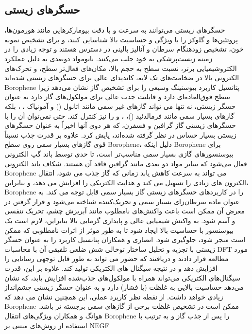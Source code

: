 \subsection{حسگرهای زیستی}
حسگرهای زیستی می‌توانند به سرعت و با دقت بیومارکرهایی مانند هورمون‌ها، پروتئین‌ها و گلوکز را با ویژگی و حساسیت بالا شناسایی کنند، \cite{taoEmergingTwodimensionalMonoelemental2019} و برای تشخیص نمونه خون، تشخیص زودهنگام سرطان و آنالیز بالینی در دسترس هستند و توجه زیادی را در زمینه زیست‌پزشکی به خود جلب می‌کنند. نانومواد دوبعدی به دلیل عملکرد الکتروشیمیایی برتر، نسبت سطح به حجم بالا،\cite{huangAdsorptionGasMolecules2018} مکان‌های فعال‌تر سطح، \cite{ranjanBoropheneNewSensation2020, li2DBoronSheets2020} و تحرک‌های الکترونی بالا در ضخامت‌های تک لایه، کاندیدای عالی برای حسگرهای زیستی شده‌اند \cite{liRatiometricImmunoassaysBuilt2019, ranjanBoropheneNewSensation2020} \gls{Borophene} پتانسیل کاربرد بیوسنینگ وسیعی را برای تشخیص گاز نشان می‌دهد زیرا سطح فوق‌العاده‌ای دارد و قابلیت جذب عالی برای مولکول‌های گاز دارد \cite{li2DBoronSheets2020} به عنوان حسگر زیستی، نه تنها می تواند گازهای غیر سمی مانند اتانول () \cite{xieTwoDimensionalBoropheneProperties2020} و آمونیاک ، \cite{huangAdsorptionGasMolecules2018}، بلکه گازهای بسیار سمی مانند فرمالدئید ()، ، و  \cite{huangAdsorptionGasMolecules2018} را نیز کنترل کند. حتی نمی‌توان آن را با حسگرهای زیستی گاز گرافین و فسفرن، که هر دوی آنها اخیراً به عنوان حسگرهای زیستی بسیار حساس در نظر گرفته شده‌اند، پایش کرد. علاوه بر قدرت جذب نسبتاً قوی گازهای بسیار سمی روی سطح \gls{Borophene}، دلیل اینکه \gls{Borophene} برای بیوسنسورهای گازی بسیار سمی مناسب‌تر است، تا حدی توسط باند گپ الکترونی فعال می‌شود که سایر مواد دو بعدی مانند گرافین فاقد آن هستند. شکاف باند الکترونی \gls{Borophene} می تواند به سرعت کاهش یابد زمانی که گاز جذب می شود، انتقال الکترون های زیادی را تسهیل می کند و هدایت الکتریکی را افزایش می دهد، و بنابراین، \gls{Borophene} را در کاربردهای حسگرهای زیستی گاز بسیار سمی قابل توجه می کند. \cite{shuklaRealization2DBorophene2017}  به عنوان ماده سرطان‌زای بسیار سمی و تحریک‌کننده شناخته می‌شود و قرار گرفتن در معرض آن ممکن است باعث واکنش‌های نامطلوب مانند آبریزش چشم، تحریک تنفسی و آسم شود. به واکنش شیمیایی عالی و پایداری گرمایی بالا \cite{cockcroftOCCUPATIONALASTHMACAUSED1982} بنابراین، لازم است یک بیوسنسور  با حساسیت بالا ایجاد شود تا به طور موثر از اثرات نامطلوبی که  ممکن است منجر شود، جلوگیری شود. انصاری و همکاران \cite{kootenaeiB36BoropheneElectronic2016} پتانسیل کاربرد  را به عنوان حسگر زیستی  با تجزیه و تحلیل ساختار توخالی شش ضلعی تلفیقی آن با محاسبات \gls{DFT} مورد مطالعه قرار دادند و دریافتند که حضور  می تواند به طور قابل توجهی رسانایی  را افزایش دهد و در نتیجه سیگنال های الکتریکی تولید کند. علاوه بر این، قدرت سیگنال‌های الکتریکی می‌تواند همراه با مولکول‌های جذب‌شده  افزایش یابد، که نشان می‌دهد  حساسیت بالایی به غلظت (یا فشار)  دارد و به عنوان حسگر زیستی  چشم‌انداز زیادی خواهد داشت. از نقطه نظر کاربرد عملی، این همچنین نشان می دهد که \gls{Borophene} ممکن است در تشخیص غلظت برخی از گازهای سمی برجسته تر باشد. هوانگ و همکاران \cite{huangAdsorptionGasMolecules2018} ویژگی‌های انتقال \gls{Borophene} را پس از جذب گاز  و  به ترتیب با استفاده از روش‌های مبتنی بر \gls{NEGF} 